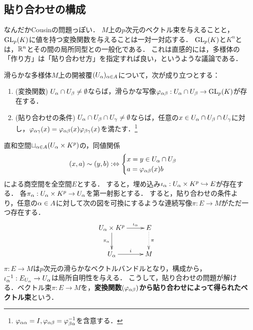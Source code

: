 \documentclass[uplatex,dvipdfmx]{jsreport}
\begin{document}
\subsection{貼り合わせの構成}

\begin{tcolorbox}[colframe=ForestGreen, colback=ForestGreen!10!white,breakable,colbacktitle=ForestGreen!40!white,coltitle=black,fonttitle=\bfseries\sffamily,
title=]
    なんだかCousinの問題っぽい．
    $M$上の$p$次元のベクトル束を与えることと，$\mathrm{GL}_p(K)$に値を持つ変換関数を与えることは一対一対応する．
    $\mathrm{GL}_p(K)$と$K^n$とは，$\mathbb{R}^n$とその間の局所同型との一般化である．
    これは直感的には，多様体の「作り方」は「貼り合わせ方」を指定すれば良い，というような議論である．
\end{tcolorbox}

\begin{problem}
    滑らかな多様体$M$上の開被覆$(U_\alpha)_{\alpha\in A}$について，次が成り立つとする：
    \begin{enumerate}
        \item (変換関数) $U_\alpha\cap U_\beta\ne\emptyset$ならば，滑らかな写像$\varphi_{\alpha\beta}:U_\alpha\cap U_\beta\to\mathrm{GL}_p(K)$が存在する．
        \item (貼り合わせの条件) $U_\alpha\cap U_\beta\cap U_\gamma\ne\emptyset$ならば，任意の$x\in U_\alpha\cap U_\beta\cap U_\gamma$に対し，$\varphi_{\alpha\gamma}(x)=\varphi_{\alpha\beta}(x)\varphi_{\beta\gamma}(x)$を満たす．\footnote{$\varphi_{\alpha\alpha}=I,\varphi_{\alpha\beta}=\varphi_{\beta\alpha}^{-1}$を含意する．}
    \end{enumerate}
\end{problem}

\begin{definition}[貼り合わせによる構成]
    直和空間$\sqcup_{\alpha\in A}(U_\alpha\times K^p)$の，同値関係
    \[(x,a)\sim (y,b):\Leftrightarrow\begin{cases}
    x=y\in U_\alpha\cap U_\beta\\
    a=\varphi_{\alpha\beta}(x)b
    \end{cases}\]
    による商空間を全空間$E$とする．
    すると，埋め込み$\iota_\alpha:U_\alpha\times K^p\hookrightarrow E$が存在する．
    各$\pi_\alpha:U_\alpha\times K^p\to U_\alpha$を第一射影とする．
    すると，貼り合わせの条件より，任意の$\alpha\in A$に対して次の図を可換にするような連続写像$\pi:E\to M$がただ一つ存在する．
    \[\xymatrix{
        U_\al\times K^p\ar[r]^-{\iota_\al}\ar[d]_-{\pi_\al}&E\ar@{.>}[d]^-\pi\\
        U_\al\ar[r]^-i&M
    }\]
    $\pi:E\to M$は$p$次元の滑らかなベクトルバンドルとなり，構成から，$\iota_\alpha^{-1}:E_{U_\alpha}\to U_\alpha$は局所自明性を与える．
    こうして，貼り合わせの問題が解ける．ベクトル束$\pi:E\to M$を，\textbf{変換関数$(\varphi_{\alpha\beta})$から貼り合わせによって得られたベクトル束}という．
\end{definition}
\end{document}

